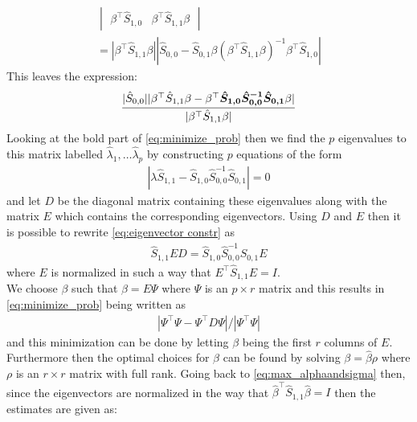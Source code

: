 \begin{bevis}
\begin{align*}
\begin{vmatrix}
         \beta^{\top}\hat{S}_{1,0}&\beta^{\top} \hat{S}_{1,1}\beta\end{vmatrix}\\
         =|\beta^{\top} \hat{S}_{1,1}\beta||\hat{S}_{0,0}-\hat{S}_{0,1}\beta(\beta^{\top} \hat{S}_{1,1}\beta)^{-1}\beta^{\top}\hat{S}_{1,0}|
 \end{align*}
 This leaves the expression:
 \begin{align}\label{eq:minimize_prob}
     \frac{|\hat{S}_{0,0}||\beta^{\top}\hat{S}_{1,1}\beta-\beta^{\top}\boldsymbol{\hat{S}_{1,0}\hat{S}^{-1}_{0,0}\hat{S}_{0,1}}\beta|}
     {|\beta^{\top} \hat{S}_{1,1}\beta|}
 \end{align}
 Looking at the bold part of \eqref{eq:minimize_prob} then we find the $p$ eigenvalues to this matrix labelled $\hat{\lambda}_1,\ldots\hat{\lambda}_p$ by constructing $p$ equations of the form
 \begin{align}\label{eq:eigenvector constr}
     |\lambda \hat{S}_{1,1}-\hat{S}_{1,0}\hat{S}^{-1}_{0,0}\hat{S}_{0,1}|=0
 \end{align}
and let $D$ be the diagonal matrix containing these eigenvalues along with the matrix $E$ which contains the corresponding eigenvectors. Using $D$ and $E$ then it is possible to rewrite \eqref{eq:eigenvector constr} as
\begin{align*}
\hat{S}_{1,1}ED=\hat{S}_{1,0}\hat{S}^{-1}_{0,0}\hat{S}_{0,1}E
\end{align*}
where $E$ is normalized in such a way that $E^\top\hat{S}_{1,1}E=I$.\\
We choose $\beta$ such that $\beta=E\Psi$ where $\Psi$ is an $p\times r$ matrix and this results in \eqref{eq:minimize_prob} being written as
\begin{align*}
    |\Psi^\top\Psi-\Psi^\top D\Psi|/|\Psi^\top\Psi|
\end{align*}
and this minimization can be done by letting $\beta$ being the first $r$ columns of $E$. Furthermore then the optimal choices for $\beta$ can be found by solving $\beta=\hat{\beta}\rho$ where $\rho$ is an $r\times r$ matrix with full rank.
Going back to \eqref{eq:max_alphaandsigma} then, since the eigenvectors are normalized in the way that $\hat{\beta}^\top \hat{S}_{1,1}\hat{\beta}=I$ then the estimates are given as:


\end{bevis}
